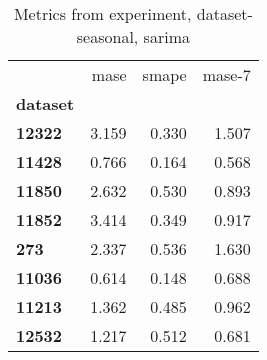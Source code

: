 \begin{table}[h]
\centering
\caption{Metrics from experiment, dataset-seasonal, sarima}
\label{table:sarima-dataset-seasonal}
\begin{tabular}{lrrr}
\toprule
{} &   mase &  smape &  mase-7 \\
\textbf{dataset} &        &        &         \\
\midrule
\textbf{12322  } &  3.159 &  0.330 &   1.507 \\
\textbf{11428  } &  0.766 &  0.164 &   0.568 \\
\textbf{11850  } &  2.632 &  0.530 &   0.893 \\
\textbf{11852  } &  3.414 &  0.349 &   0.917 \\
\textbf{273    } &  2.337 &  0.536 &   1.630 \\
\textbf{11036  } &  0.614 &  0.148 &   0.688 \\
\textbf{11213  } &  1.362 &  0.485 &   0.962 \\
\textbf{12532  } &  1.217 &  0.512 &   0.681 \\
\bottomrule
\end{tabular}
\end{table}
